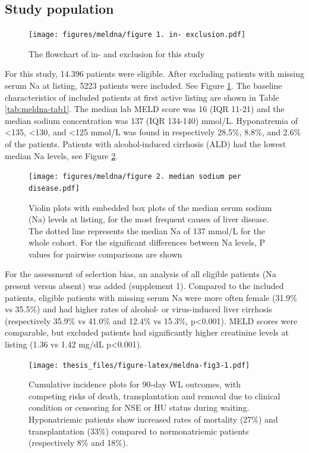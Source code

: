 \documentclass[11pt,english,]{book} %
\begin{document}
\linespread{1.213}

\hypertarget{study-population}{%
\subsection*{Study population}\label{study-population}}

\begin{figure}
\centering
\texttt{[image: figures/meldna/figure 1. in- exclusion.pdf]}
\caption{\label{fig:meldna-fig1}The flowchart of in- and exclusion for this study}
\end{figure}

For this study, 14.396 patients were eligible. After excluding patients with missing serum Na at listing, 5223 patients were included. See Figure \ref{fig:meldna-fig1}. The baseline characteristics of included patients at first active listing are shown in Table \ref{tab:meldna-tab1}. The median lab MELD score was 16 (IQR 11-21) and the median sodium concentration was 137 (IQR 134-140) mmol/L. Hyponatremia of \textless135, \textless130, and \textless125 mmol/L was found in respectively 28.5\%, 8.8\%, and 2.6\% of the patients. Patients with alcohol-induced cirrhosis (ALD) had the lowest median Na levels, see Figure \ref{fig:meldna-fig2}.

\begin{figure}
\centering
\texttt{[image: figures/meldna/figure 2. median sodium per disease.pdf]}
\caption{\label{fig:meldna-fig2}Violin plots with embedded box plots of the median serum sodium (Na) levels at listing, for the most frequent causes of liver disease. The dotted line represents the median Na of 137 mmol/L for the whole cohort. For the significant differences between Na levels, P values for pairwise comparisons are shown}
\end{figure}

For the assessment of selection bias, an analysis of all eligible patients (Na present versus absent) was added (supplement 1). Compared to the included patients, eligible patients with missing serum Na were more often female (31.9\% vs 35.5\%) and had higher rates of alcohol- or virus-induced liver cirrhosis (respectively 35.9\% vs 41.0\% and 12.4\% vs 15.3\%, p\textless0.001). MELD scores were comparable, but excluded patients had significantly higher creatinine levels at listing (1.36 vs 1.42 mg/dL p\textless0.001).

\begin{figure}
\centering
\texttt{[image: thesis\_files/figure-latex/meldna-fig3-1.pdf]}
\caption{\label{fig:meldna-fig3}Cumulative incidence plots for 90-day WL outcomes, with competing risks of death, transplantation and removal due to clinical condition or censoring for NSE or HU status during waiting. Hyponatriemic patients show increased rates of mortality (27\%) and transplantation (33\%) compared to normonatriemic patients (respectively 8\% and 18\%).}
\end{figure}
\end{document}
